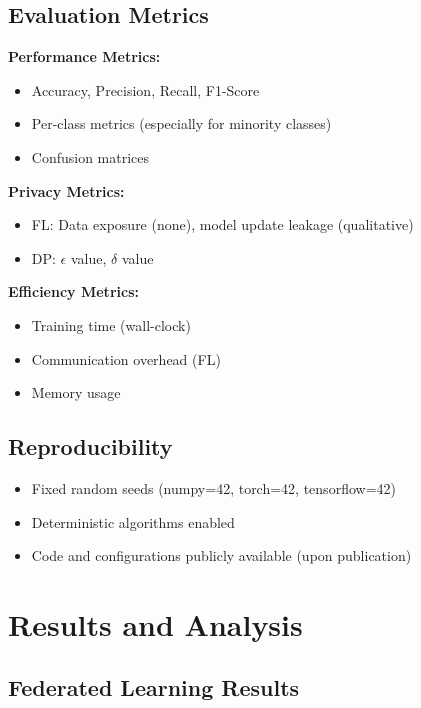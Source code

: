 \documentclass[conference]{IEEEtran}
\begin{document}
\subsection{Evaluation Metrics}

\textbf{Performance Metrics:}
\begin{itemize}
    \item Accuracy, Precision, Recall, F1-Score
    \item Per-class metrics (especially for minority classes)
    \item Confusion matrices
\end{itemize}

\textbf{Privacy Metrics:}
\begin{itemize}
    \item FL: Data exposure (none), model update leakage (qualitative)
    \item DP: $\epsilon$ value, $\delta$ value
\end{itemize}

\textbf{Efficiency Metrics:}
\begin{itemize}
    \item Training time (wall-clock)
    \item Communication overhead (FL)
    \item Memory usage
\end{itemize}

\subsection{Reproducibility}

\begin{itemize}
    \item Fixed random seeds (numpy=42, torch=42, tensorflow=42)
    \item Deterministic algorithms enabled
    \item Code and configurations publicly available (upon publication)
\end{itemize}

\section{Results and Analysis}
\label{sec:results}


\subsection{Federated Learning Results}
\end{document}
